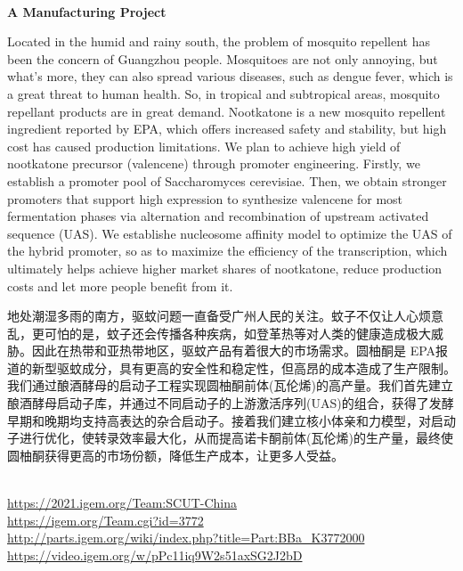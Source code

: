 \textbf{\\A Manufacturing Project\\}\begin{spacing}{1.5}

Located in the humid and rainy south, the problem of mosquito repellent has been the concern of Guangzhou people. Mosquitoes are not only annoying, but what’s more, they can also spread various diseases, such as dengue fever, which is a great threat to human health. So, in tropical and subtropical areas, mosquito repellant products are in great demand. Nootkatone is a new mosquito repellent ingredient reported by EPA, which offers increased safety and stability, but high cost has caused production limitations. We plan to achieve high yield of nootkatone precursor (valencene) through promoter engineering. Firstly, we establish a promoter pool of Saccharomyces cerevisiae. Then, we obtain stronger promoters that support high expression to synthesize valencene for most fermentation phases via alternation and recombination of upstream activated sequence (UAS). We establishe nucleosome affinity model to optimize the UAS of the hybrid promoter, so as to maximize the efficiency of the transcription, which ultimately helps achieve higher market shares of nootkatone, reduce production costs and let more people benefit from it.

地处潮湿多雨的南方，驱蚊问题一直备受广州人民的关注。蚊子不仅让人心烦意乱，更可怕的是，蚊子还会传播各种疾病，如登革热等对人类的健康造成极大威胁。因此在热带和亚热带地区，驱蚊产品有着很大的市场需求。圆柚酮是 EPA报道的新型驱蚊成分，具有更高的安全性和稳定性，但高昂的成本造成了生产限制。我们通过酿酒酵母的启动子工程实现圆柚酮前体(瓦伦烯)的高产量。我们首先建立酿酒酵母启动子库，并通过不同启动子的上游激活序列(UAS)的组合，获得了发酵早期和晚期均支持高表达的杂合启动子。接着我们建立核小体亲和力模型，对启动子进行优化，使转录效率最大化，从而提高诺卡酮前体(瓦伦烯)的生产量，最终使圆柚酮获得更高的市场份额，降低生产成本，让更多人受益。\end{spacing}
\\

\url{https://2021.igem.org/Team:SCUT-China }\\
\url{https://igem.org/Team.cgi?id=3772 }\\
\url{http://parts.igem.org/wiki/index.php?title=Part:BBa_K3772000 }\\
\url{https://video.igem.org/w/pPc11iq9W2s51axSG2J2bD }\\

\vfill{}









